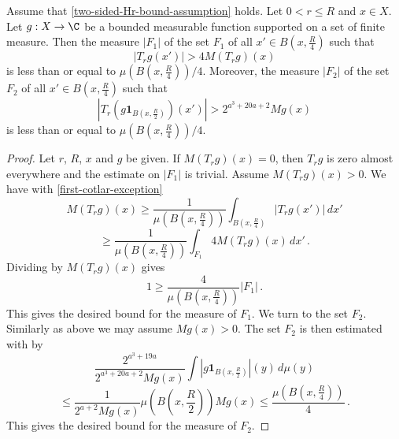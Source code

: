 \begin{lemma}
\label{Cotlar-sets}
Assume that \eqref{two-sided-Hr-bound-assumption} holds. Let $0<r\le R$ and  $x\in X$. Let $g:X\to\C$ be a bounded measurable function supported on a set of finite measure.
Then the measure $|F_1|$ of the set $F_1$ of all $x'\in B(x,\frac {R} 4)$ such that
\begin{equation}
\label{first-cotlar-exception}
    |T_rg(x')|> 4 M(T_rg)(x)
\end{equation}
is less than or equal to $\mu(B(x,\frac{R}{4}))/4$.
Moreover,  the measure $|F_2|$ of the set $F_2$ of all $x'\in
B(x,\frac {R} 4)$ such that
\begin{equation}
\label{second-cotlar-exception}
    |T_r(g\mathbf{1}_{B(x,\frac {R} 2)})(x')| > 2^{a^3 + 20a + 2} Mg(x)
\end{equation}
is less than or equal to  $\mu(B(x,\frac{R}{4}))/4$.
\end{lemma}

\begin{proof}
Let $r$, $R$, $x$ and $g$ be given.
If $M(T_rg)(x)=0$, then $T_rg$ is zero almost everywhere and the estimate on $|F_1|$ is trivial.
Assume $M(T_rg)(x)>0$.
We have with \eqref{first-cotlar-exception}
\begin{equation}
    M(T_rg)(x)\ge
    \frac 1{\mu(B(x,\frac{R}{4}))}\int_{B(x,\frac{R}{4})}|T_rg(x')|\, dx'
\end{equation}
\begin{equation}
    \ge
    \frac 1{\mu(B(x,\frac{R}{4}))}\int_{F_1} 4 M(T_rg)(x)\, dx' \,.
\end{equation}
Dividing by $M(T_rg)(x)$ gives
\begin{equation}
    1\ge \frac{4}{\mu(B(x,\frac{R}{4}))} |F_1|\, .
\end{equation}
This gives the desired bound for the measure of $F_1$.
We turn to the set $F_2$. Similarly as above we may assume $Mg(x)>0$.
The set $F_2$ is then estimated with  by
\begin{equation}
   \frac {2^{a^3+19a}}{2^{a^3 + 20a + 2}Mg(x)}\int |g\mathbf{1}_{B(x,\frac {R}2)}|(y)\, d\mu(y)
\end{equation}
\begin{equation}
   \le \frac {1}{2^{a+2} Mg(x)}\mu(B(x,\frac {R}{2})) Mg(x) \le \frac{\mu(B(x,\frac {R}{4}))}{4} \,.
\end{equation}
This gives the desired bound for the measure of $F_2$.
\end{proof}

